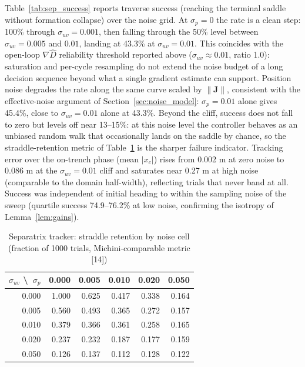 \documentclass[lettersize,journal]{IEEEtran}
\begin{document}
Table~\ref{tab:sep_success} reports traverse success (reaching the
terminal saddle without formation collapse) over the noise grid. At
$\sigma_p = 0$ the rate is a clean step: 100\% through
$\sigma_{uv} = 0.001$, then falling through the 50\% level between
$\sigma_{uv} = 0.005$ and $0.01$, landing at 43.3\% at
$\sigma_{uv} = 0.01$. This coincides with the open-loop
$\nabla\hat{D}$ reliability threshold reported above
($\sigma_{uv} \approx 0.01$, ratio 1.0): saturation and per-cycle
resampling do not extend the noise budget
of a long decision sequence beyond what a single gradient estimate can
support. Position noise degrades the rate along the same curve scaled
by $\|\mathbf{J}\|$, consistent with the effective-noise argument of
Section~\ref{sec:noise_model}: $\sigma_p = 0.01$ alone gives 45.4\%,
close to $\sigma_{uv} = 0.01$ alone at 43.3\%. Beyond the cliff, success
does not fall to zero but levels off near 13--15\%: at this noise level
the controller behaves as an unbiased random walk that occasionally
lands on the saddle by chance, so the straddle-retention metric of
Table~\ref{tab:sep_straddle} is the sharper failure indicator. Tracking
error over the on-trench phase (mean $|x_c|$) rises from 0.002 m at zero
noise to 0.086 m at the $\sigma_{uv} = 0.01$ cliff and saturates near
0.27 m at high noise (comparable to the domain half-width), reflecting
trials that never band at all. Success was independent of initial
heading to within the sampling noise of the sweep (quartile success
74.9--76.2\% at low noise, confirming the isotropy of
Lemma~\ref{lem:gains}).

\begin{table}[!t]
\centering
\caption{Separatrix tracker: straddle retention by noise cell (fraction
of 1000 trials, Michini-comparable metric [14])}
\label{tab:sep_straddle}
\footnotesize
\setlength{\tabcolsep}{4pt}
\begin{tabular}{r|rrrrr}
\hline
$\sigma_{uv}$ \textbackslash\ $\sigma_p$ & 0.000 & 0.005 & 0.010 & 0.020 & 0.050 \\
\hline
0.000 & 1.000 & 0.625 & 0.417 & 0.338 & 0.164 \\
0.005 & 0.560 & 0.493 & 0.365 & 0.272 & 0.157 \\
0.010 & 0.379 & 0.366 & 0.361 & 0.258 & 0.165 \\
0.020 & 0.237 & 0.232 & 0.187 & 0.177 & 0.159 \\
0.050 & 0.126 & 0.137 & 0.112 & 0.128 & 0.122 \\
\hline
\end{tabular}
\end{table}
\end{document}
